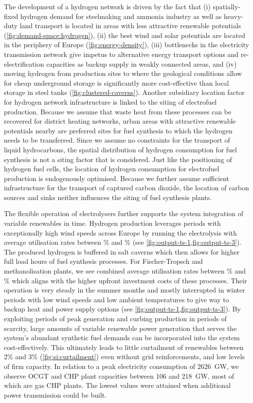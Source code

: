 The development of a hydrogen network is driven by the fact that (i)
spatially-fixed hydrogen demand for steelmaking and ammonia industry as well as
heavy-duty land transport is located in areas with less attractive renewable
potentials (\cref{fig:demand-space:hydrogen}), (ii) the best wind and solar
potentials are located in the periphery of Europe (\cref{fig:energy-density}),
(iii) bottlenecks in the electricity transmission network give impetus to
alternative energy transport options and re-electrification capacities as backup
supply in weakly connected areas, and (iv) moving hydrogen from production sites
to where the geological conditions allow for cheap underground storage is
significantly more cost-effective than local storage in steel tanks
(\cref{fig:clustered-caverns}). Another subsidiary location factor for hydrogen
network infrastructure is linked to the siting of electrofuel production.
Because we assume that waste heat from these processes can be recovered for
district heating networks, urban areas with attractive renewable potentials
nearby are preferred sites for fuel synthesis to which the hydrogen needs to be
transferred. Since we assume no constraints for the transport of liquid
hydrocarbons, the spatial distribution of hydrogen consumption for fuel
synthesis is not a siting factor that is considered. Just like the positioning
of hydrogen fuel cells, the location of hydrogen consumption for electrofuel
production is endogenously optimised. Because we further assume sufficient
infrastructure for the transport of captured carbon dioxide, the location of
carbon sources and sinks neither influences the siting of fuel synthesis plants.

The flexible operation of electrolysers further supports the system integration
of variable renewables in time. Hydrogen production leverages periods with
exceptionally high wind speeds across Europe by running the electrolysis with
average utilisation rates between \mincfelectrolysis\% and \maxcfelectrolysis\%
(see \cref{fig:output-ts-1,fig:output-ts-3}). The produced hydrogen is buffered
in salt caverns which then allows for higher full load hours of fuel synthesis
processes. For Fischer-Tropsch and methanolisation plants, we see combined
average utilisation rates between \mincfFT\% and \maxcfFT\% which aligns with
the higher upfront investment costs of these processes. Their operation is very
steady in the summer months and mostly interrupted in winter periods with low
wind speeds and low ambient temperatures to give way to backup heat and power
supply options (see \cref{fig:output-ts-1,fig:output-ts-3}). By exploiting
periods of peak generation and curbing production in periods of scarcity, large
amounts of variable renewable power generation that serves the system's abundant
synthetic fuel demands can be incorporated into the system cost-effectively.
This ultimately leads to little curtailment of renewables between 2\% and 3\%
(\cref{fig:si:curtailment}) even without grid reinforcements, and low levels of
firm capacity. In relation to a peak electricity consumption of 2626~GW\el, we
observe OCGT and CHP plant capacities between 106 and 218~GW\el, most of which
are gas CHP plants. The lowest values were attained when additional power
transmission could be built.

